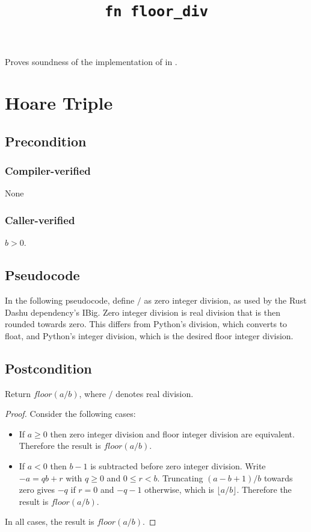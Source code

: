 \documentclass{article}
\title{\texttt{fn floor\_div}}
\author{\MichaelShoemateAuthor}
\date{}
\begin{document}
\maketitle

\contrib
Proves soundness of the implementation of  in .

\section{Hoare Triple}
\subsection*{Precondition}
\subsubsection*{Compiler-verified}
None

\subsubsection*{Caller-verified}
$b>0$.

\subsection*{Pseudocode}
In the following pseudocode, define $/$ as zero integer division, as used by the Rust Dashu dependency's IBig.
Zero integer division is real division that is then rounded towards zero.
This differs from Python's division, which converts to float,
and Python's integer division, which is the desired floor integer division.



\subsection*{Postcondition}
\begin{theorem}
    Return $floor(a / b)$, where $/$ denotes real division.
\end{theorem}

\begin{proof}
    Consider the following cases:
    \begin{itemize}
        \item If $a \geq 0$ then zero integer division and floor integer division are equivalent.
            Therefore the result is $floor(a / b)$.
        \item If $a < 0$ then $b - 1$ is subtracted before zero integer division.
            Write $-a=qb+r$ with $q\geq 0$ and $0\leq r<b$.
            Truncating $(a-b+1)/b$ towards zero gives $-q$ if $r=0$ and $-q-1$ otherwise, which is $\lfloor a/b\rfloor$.
            Therefore the result is $floor(a / b)$.
    \end{itemize}
    In all cases, the result is $floor(a / b)$.
\end{proof}
\end{document}
